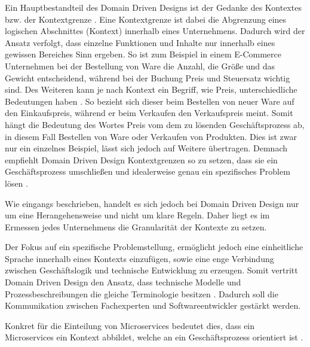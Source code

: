 Ein Hauptbestandteil des Domain Driven Designs ist der Gedanke des Kontextes bzw. der Kontextgrenze \parencite[vgl.][]{fowler_boundedContext_2014}. Eine Kontextgrenze ist dabei die Abgrenzung eines logischen Abschnittes (Kontext) innerhalb eines Unternehmens. Dadurch wird der Ansatz verfolgt, dass einzelne Funktionen und Inhalte nur innerhalb eines gewissen Bereiches Sinn ergeben. So ist zum Beispiel in einem E-Commerce Unternehmen bei der Bestellung von Ware die Anzahl, die Größe und das Gewicht entscheidend, während bei der Buchung Preis und Steuersatz wichtig sind. Des Weiteren kann je nach Kontext ein Begriff, wie Preis, unterschiedliche Bedeutungen haben \parencite[vgl.][S. 24 ff.]{evans_domain-driven_2003}. So bezieht sich dieser beim Bestellen von neuer Ware auf den Einkaufspreis, während er beim Verkaufen den Verkaufspreis meint. Somit hängt die Bedeutung des Wortes Preis vom dem zu lösenden Geschäftsprozess ab, in diesem Fall Bestellen von Ware oder Verkaufen von Produkten. Dies ist zwar nur ein einzelnes Beispiel, lässt sich jedoch auf Weitere übertragen. Demnach empfiehlt Domain Driven Design Kontextgrenzen so zu setzen, dass sie ein Geschäftsprozess umschließen und idealerweise genau ein spezifisches Problem lösen \parencite[vgl.][Kap. 4.3]{wolff_microservices_2018}.


Wie eingangs beschrieben, handelt es sich jedoch bei Domain Driven Design nur um eine Herangehensweise und nicht um klare Regeln. Daher liegt es im Ermessen jedes Unternehmens die Granularität der Kontexte zu setzen.

Der Fokus auf ein spezifische Problemstellung, ermöglicht jedoch eine einheitliche Sprache innerhalb eines Kontexts einzufügen, sowie eine enge Verbindung zwischen Geschäftslogik und technische Entwicklung zu erzeugen. Somit vertritt Domain Driven Design den Ansatz, dass technische Modelle und Prozessbeschreibungen die gleiche Terminologie besitzen \parencite[vgl.][S. 24 ff.]{evans_domain-driven_2003}. Dadurch soll die Kommunikation zwischen Fachexperten und Softwareentwickler gestärkt werden.

Konkret für die Einteilung von Microservices bedeutet dies, dass ein Microservices ein Kontext abbildet, welche an ein Geschäftsprozess orientiert ist \parencites[vgl.][Kap. 4.3]{wolff_microservices_2018}[vgl.][Kap. 4]{newman_monolith_2019}.

